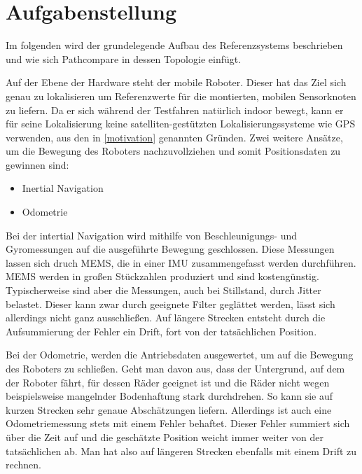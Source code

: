 \section{Aufgabenstellung}
\label{sec:aufgabenstellung}

Im folgenden wird der grundelegende Aufbau des Referenzsystems beschrieben und
wie sich Pathcompare in dessen Topologie einfügt. 

Auf der Ebene der Hardware steht der mobile Roboter. Dieser hat das Ziel sich
genau zu lokalisieren um Referenzwerte für die montierten, mobilen Sensorknoten zu
liefern. Da er sich während der Testfahren natürlich indoor bewegt, kann er
für seine Lokalisierung keine satelliten-gestützten Lokalisierungssysteme wie
GPS verwenden, aus den in \ref{motivation} genannten Gründen. Zwei weitere
Ansätze, um die Bewegung des Roboters nachzuvollziehen und somit Positionsdaten
zu gewinnen sind:

\begin{itemize}
  \item Inertial Navigation
  \item Odometrie
\end{itemize}

Bei der intertial Navigation wird mithilfe von Beschleunigungs- und
Gyromessungen auf die ausgeführte Bewegung geschlossen. Diese Messungen lassen
sich druch \gls{MEMS}, die in einer 
\gls{IMU} zusammengefasst werden durchführen.
\gls{MEMS} werden in großen Stückzahlen produziert und sind kostengünstig.
Typischerweise sind aber die Messungen, auch bei Stillstand, durch Jitter belastet.
Dieser kann zwar durch geeignete Filter geglättet werden, lässt sich allerdings
nicht ganz ausschließen. Auf längere Strecken entsteht durch die Aufsummierung
der Fehler ein Drift, fort von der tatsächlichen Position.

Bei der Odometrie, werden die Antriebsdaten ausgewertet, um auf die Bewegung
des Roboters zu schließen. Geht man davon aus, dass der Untergrund, auf dem der
Roboter fährt, für dessen Räder geeignet ist und die Räder nicht wegen
beispielsweise mangelnder Bodenhaftung stark durchdrehen. So kann sie auf
kurzen Strecken sehr genaue Abschätzungen liefern. Allerdings ist auch eine Odometriemessung
stets mit einem Fehler behaftet. Dieser Fehler summiert sich über die Zeit auf
und die geschätzte Position weicht immer weiter von der tatsächlichen ab. Man
hat also auf längeren Strecken ebenfalls mit einem Drift zu rechnen.

